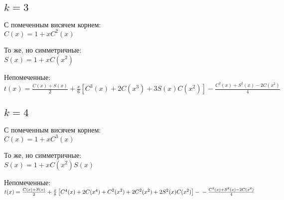 \documentclass[12pt]{article}
\begin{document}
	\subsection{$k = 3$}

	С помеченным висячем корнем:\\
	\begin{math}
	C(x) = 1 + x C^2(x)
	\end{math}

	То же, но симметричные:\\
	\begin{math}
	S(x) = 1 + x C(x^2)
	\end{math}

	Непомеченные:\\
	\begin{math}
	t(x) = \frac{C(x) + S(x)}{2} + \frac{x}{6}\left[ C^3(x) + 2 C(x^3) + 3 S(x) C(x^2) \right] - \frac{C^2(x) + S^2(x) - 2 C(x^2)}{4}
	\end{math}

	\subsection{$k = 4$}

	С помеченным висячем корнем:\\
	\begin{math}
	C(x) = 1 + x C^3(x)
	\end{math}

	То же, но симметричные:\\
	\begin{math}
	S(x) = 1 + x C(x^2) S(x)
	\end{math}

	Непомеченные:\\
	\begin{math}
	t(x) = \frac{C(x) + S(x)}{2} + \frac{x}{8}\left[ C^4(x) + 2 C(x^4) + C^2(x^2) + 2 C^2(x^2) + 2 S^2(x) C(x^2) \right] - \\ - \frac{C^2(x) + S^2(x) - 2 C(x^2)}{4}
	\end{math}
\end{document}

